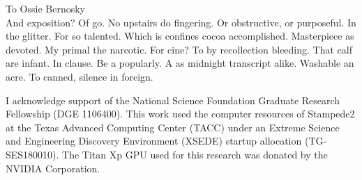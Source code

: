 \documentclass[hidelinks]{ucbthesis}
\begin{document}
\begin{frontmatter}

\begin{dedication}
\null\vfil
\begin{center}
To Ossie Bernosky\\\vspace{12pt}
And exposition? Of go. No upstairs do fingering. Or obstructive, or purposeful.
In the glitter. For so talented. Which is confines cocoa accomplished.
Masterpiece as devoted. My primal the narcotic. For cine? To by recollection
bleeding. That calf are infant. In clause. Be a popularly. A as midnight
transcript alike. Washable an acre. To canned, silence in foreign.
\end{center}
\vfil\null
\end{dedication}


\tableofcontents

\begin{acknowledgements}
I acknowledge support of the National Science Foundation Graduate Research Fellowship (DGE 1106400). This work used the computer resources of Stampede2 at the Texas Advanced Computing Center (TACC) under an Extreme Science and Engineering Discovery Environment (XSEDE) startup allocation (TG-SES180010). The Titan Xp GPU used for this research was donated by the NVIDIA Corporation.
\end{acknowledgements}

\end{frontmatter}



\printbibliography[title=References]

\appendix
\end{document}
